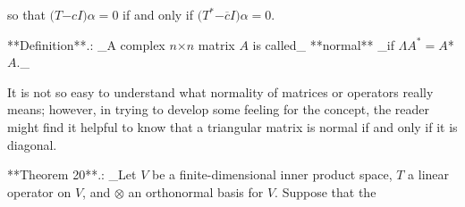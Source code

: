 so that \((T\)\(-\)\(cI)\alpha\)\(=\)\(0\) if and only if \((T^{*}\)\(-\)\(\overline{c}I)\alpha\)\(=\)\(0\).

**Definition**.: _A complex \(n\)\(\times\)\(n\) matrix \(A\) is called_ **normal** _if \(\Lambda A^{*}\)\(=\)\(A\)*\(A\)._

It is not so easy to understand what normality of matrices or operators really means; however, in trying to develop some feeling for the concept, the reader might find it helpful to know that a triangular matrix is normal if and only if it is diagonal.

**Theorem 20**.: _Let \(V\) be a finite-dimensional inner product space, \(T\) a linear operator on \(V\), and \(\otimes\) an orthonormal basis for \(V\). Suppose that the 